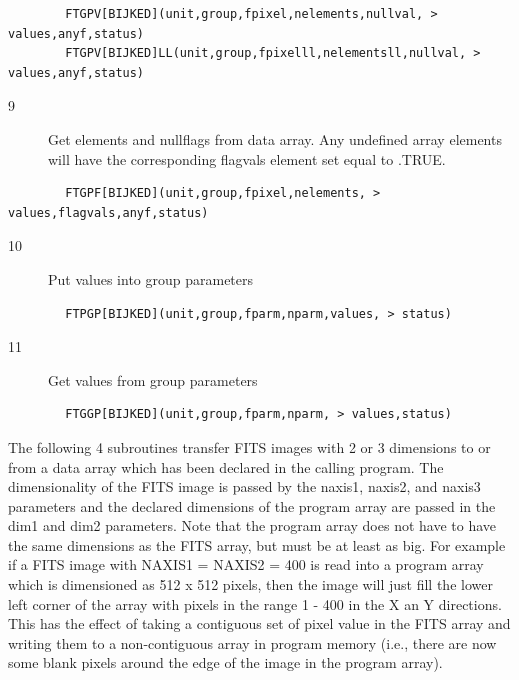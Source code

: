 \documentclass[11pt]{book}
\begin{document}
\begin{verbatim}
        FTGPV[BIJKED](unit,group,fpixel,nelements,nullval, > values,anyf,status)
        FTGPV[BIJKED]LL(unit,group,fpixelll,nelementsll,nullval, > values,anyf,status)
\end{verbatim}

\begin{description}
\item[9 ] Get elements and nullflags from data array.
    Any undefined array elements will have the corresponding flagvals element
   set equal to .TRUE.
\end{description}

\begin{verbatim}
        FTGPF[BIJKED](unit,group,fpixel,nelements, > values,flagvals,anyf,status)
\end{verbatim}

\begin{description}
\item[10]  Put values into group parameters
\end{description}

\begin{verbatim}
        FTPGP[BIJKED](unit,group,fparm,nparm,values, > status)
\end{verbatim}

\begin{description}
\item[11]  Get values from group parameters
\end{description}

\begin{verbatim}
        FTGGP[BIJKED](unit,group,fparm,nparm, > values,status)
\end{verbatim}
The following 4 subroutines transfer FITS images with 2 or 3 dimensions
to or from a data array which has been declared in the calling program.
The dimensionality of the FITS image is passed by the naxis1, naxis2,
and naxis3 parameters and the declared dimensions of the program array
are passed in the dim1 and dim2 parameters.  Note that the program array
does not have to have the same dimensions as the FITS array, but must
be at least as big.  For example if a FITS image with NAXIS1 = NAXIS2 = 400
is read into a program array which is dimensioned as 512 x 512 pixels,
then the image will just fill the lower left corner of the array
with pixels in the range 1 - 400 in the X an Y directions.  This has
the effect of taking a contiguous set of pixel value in the FITS array
and writing them to a non-contiguous array in program memory
(i.e., there are now some blank pixels around the edge of the image
in the program array).
\end{document}
